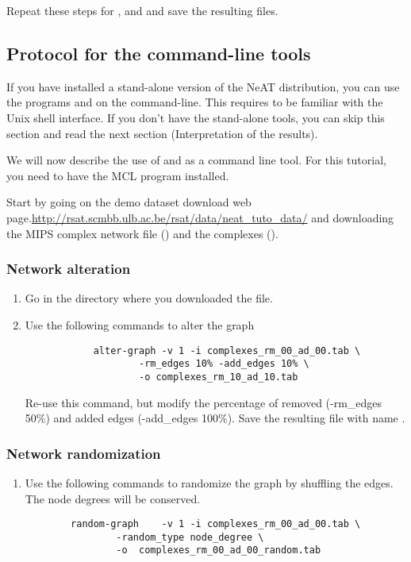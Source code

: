 Repeat these steps for ,  and  and save the resulting files.


\subsection{Protocol for the command-line tools}

If you have installed a stand-alone version of the NeAT distribution,
you can use the programs  and  on the
command-line. This requires to be familiar with the Unix shell
interface. If you don't have the stand-alone tools, you can skip this
section and read the next section (Interpretation of the results).

We will now describe the use of  and  as a command line tool. For this tutorial, you need to have the MCL program installed. 

Start by going on the demo dataset download web page.\url{http://rsat.scmbb.ulb.ac.be/rsat/data/neat\_tuto\_data/} and downloading the MIPS complex network file () and the complexes ().


\subsubsection{Network alteration}

\begin{enumerate}

\item Go in the directory where you downloaded the file.
\item Use the following commands to alter the graph
{\color{Blue} \begin{footnotesize} 
		\begin{verbatim}
			alter-graph	-v 1 -i complexes_rm_00_ad_00.tab \
					-rm_edges 10% -add_edges 10% \
					-o complexes_rm_10_ad_10.tab
		\end{verbatim} \end{footnotesize}
	}
Re-use this command, but modify the percentage of removed (-rm\_edges 50\%) and added edges (-add\_edges 100\%). Save the resulting file with name .
\end{enumerate}
\subsubsection{Network randomization}
\begin{enumerate}
\item Use the following commands to randomize the graph by shuffling the edges. The node degrees will be conserved.
{\color{Blue} \begin{footnotesize} 
		\begin{verbatim}
		random-graph 	-v 1 -i complexes_rm_00_ad_00.tab \
				-random_type node_degree \
				-o  complexes_rm_00_ad_00_random.tab
		\end{verbatim} \end{footnotesize}
	}
\end{enumerate}
